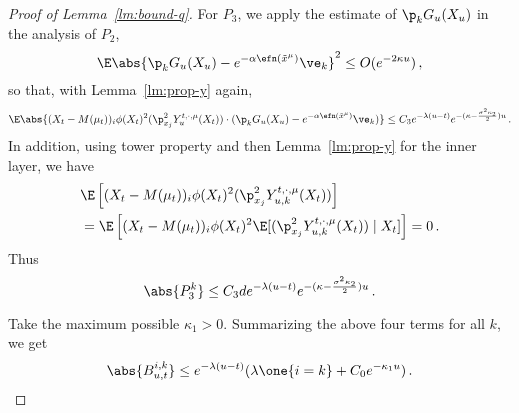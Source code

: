 \documentclass{amsart}
\begin{document}
\begin{proof}[Proof of Lemma~\ref{lm:bound-q}]
	For $P_3$, we apply the estimate of $\p_k G_u(X_u)$ in the analysis of $P_2$,
	\begin{equation*}
		\E \abs{\p_k G_u(X_u) -  e^{-\alpha \efn(\tilde x^\mu)}\ve_k}^2 \le O(e^{-2\kappa u}) \,,
	\end{equation*} 
	so that, with Lemma~\ref{lm:prop-y} again,
	\begin{equation*}
		\E \abs{(X_t - M(\mu_t))_i \phi(X_t)^2  (\p_{x_j}^2 Y^{t,\cdot,\mu}_u(X_t)) \cdot (\p_k G_u(X_u) -  e^{-\alpha \efn(\tilde x^\mu)}\ve_k)} \le C_3 e^{-\lambda (u-t)} e^{-(\kappa - \frac{\sigma^2 \kappa_2}{2}) u} \,.
	\end{equation*}
	In addition, using tower property and then Lemma~\ref{lm:prop-y} for the inner layer, we have 
	\begin{align*}
		& \E \left[ (X_t - M(\mu_t))_i \phi(X_t)^2  (\p_{x_j}^2 Y^{t,\cdot,\mu}_{u,k}(X_t)) \right] \\
		& = \E \left[ (X_t - M(\mu_t))_i \phi(X_t)^2  \E[ (\p_{x_j}^2 Y^{t,\cdot,\mu}_{u,k}(X_t)) \mid X_t] \right] = 0 \,.
	\end{align*}
	Thus 
	\begin{equation*}
		\abs{P^k_3} \le C_3 d e^{-\lambda(u-t)} e^{-(\kappa - \frac{\sigma^2 \kappa_2}{2}) u} \,.
	\end{equation*}

	Take the maximum possible $\kappa_1 > 0$. 
	Summarizing the above four terms for all $k$, we get 
	\begin{equation*}
		\abs{B^{i,k}_{u,t}} \le e^{-\lambda(u-t)} (\lambda \one{i=k} + C_0 e^{-\kappa_1 u}) \,.
	\end{equation*}


\end{proof}
\end{document}
